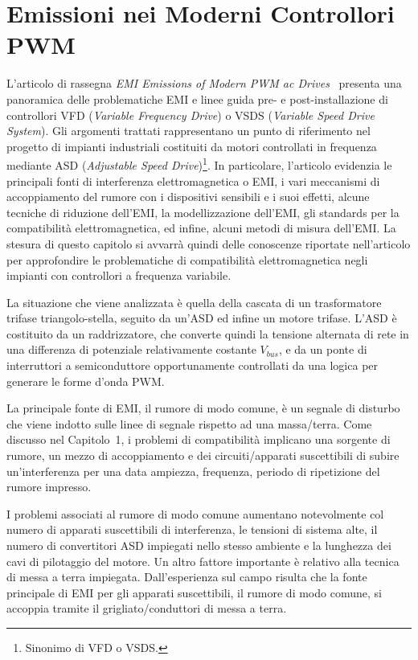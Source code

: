 \chapter{Emissioni nei Moderni Controllori PWM}
\label{ch:emissioni}

L'articolo di rassegna \textit{EMI Emissions of Modern PWM ac Drives}~\cite{skibinski1999} presenta una panoramica delle problematiche EMI e linee guida pre- e post-installazione di controllori VFD (\textit{Variable Frequency Drive}) o VSDS (\textit{Variable Speed Drive System}). Gli argomenti trattati rappresentano un punto di riferimento nel progetto di impianti industriali costituiti da motori controllati in frequenza mediante ASD (\textit{Adjustable Speed Drive})\footnote{Sinonimo di VFD o VSDS.}. In particolare, l'articolo evidenzia le principali fonti di interferenza elettromagnetica o EMI, i vari meccanismi di accoppiamento del rumore con i dispositivi sensibili e i suoi effetti, alcune tecniche di riduzione dell'EMI, la modellizzazione dell'EMI, gli standards per la compatibilità elettromagnetica, ed infine, alcuni metodi di misura dell'EMI. La stesura di questo capitolo si avvarrà quindi delle conoscenze riportate nell'articolo per approfondire le problematiche di compatibilità elettromagnetica negli impianti con controllori a frequenza variabile.

La situazione che viene analizzata è quella della cascata di un trasformatore trifase triangolo-stella, seguito da un'ASD ed infine un motore trifase. L'ASD è costituito da un raddrizzatore, che converte quindi la tensione alternata di rete in una differenza di potenziale relativamente costante $V_{bus}$, e da un ponte di interruttori a semiconduttore opportunamente controllati da una logica per generare le forme d'onda PWM.

La principale fonte di EMI, il rumore di modo comune, è un segnale di disturbo che viene indotto sulle linee di segnale rispetto ad una massa/terra. Come discusso nel Capitolo~1, i problemi di compatibilità implicano una sorgente di rumore, un mezzo di accoppiamento e dei circuiti/apparati suscettibili di subire un'interferenza per una data ampiezza, frequenza, periodo di ripetizione del rumore impresso.

I problemi associati al rumore di modo comune aumentano notevolmente col numero di apparati suscettibili di interferenza, le tensioni di sistema alte, il numero di convertitori ASD impiegati nello stesso ambiente e la lunghezza dei cavi di pilotaggio del motore. Un altro fattore importante è relativo alla tecnica di messa a terra impiegata. Dall'esperienza sul campo risulta che la fonte principale di EMI per gli apparati suscettibili, il rumore di modo comune, si accoppia tramite il grigliato/conduttori di messa a terra.


